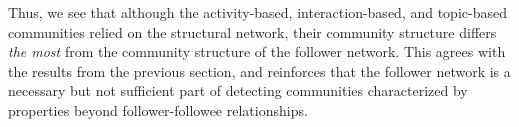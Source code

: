 Thus, we see that although the activity-based, interaction-based, and topic-based communities relied on the structural network, their community structure differs \emph{the most} from the community structure of the follower network. This agrees with the results from the previous section, and reinforces that the follower network is a necessary but not sufficient part of detecting communities characterized by properties beyond follower-followee relationships.






